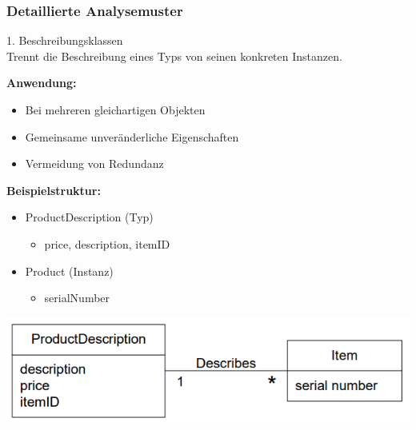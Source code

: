 \columnbreak

\subsubsection{Detaillierte Analysemuster}

\begin{concept}{1. Beschreibungsklassen}\\
Trennt die Beschreibung eines Typs von seinen konkreten Instanzen.

\textbf{Anwendung:}
\begin{itemize}
    \item Bei mehreren gleichartigen Objekten
    \item Gemeinsame unveränderliche Eigenschaften
    \item Vermeidung von Redundanz
\end{itemize}

\begin{minipage}{0.45\linewidth}
\textbf{Beispielstruktur:}
\begin{itemize}
    \item ProductDescription (Typ)
    \begin{itemize}
        \item price, description, itemID
    \end{itemize}
    \item Product (Instanz)
    \begin{itemize}
        \item serialNumber
    \end{itemize}
\end{itemize}
\end{minipage}
\begin{minipage}{0.5\linewidth}
\includegraphics[width=\linewidth]{images/beschreibungsklasse_better.png}
\end{minipage}
\end{concept}

